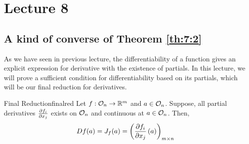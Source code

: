 \documentclass[../Analysis-3.tex]{subfiles}
\begin{document}
\chapter*{Lecture 8} %
\setcounter{chapter}{8} %
\setcounter{section}{0}

\section{A kind of converse of Theorem \ref{th:7:2}}

As we have seen in previous lecture, the differentiability of a function gives an explicit expression for derivative with the existence of partials. In this lecture, we will prove a sufficient condition for differentiability based on its partials, which will be our final reduction for derivatives.

\begin{Thm}{Final Reduction}{finalred}
  Let $ f :\mathcal{O}_{n} \to \mathbb{R}^m $ and $ a \in \mathcal{O}_{n} $. Suppose, all partial derivatives $ \pdv{f_i}{x_j} $ exists on $ \mathcal{O}_{n} $ and continuous at $ a \in \mathcal{O}_{n} $. Then,
  \begin{align*}
    Df(a) = J_{f}(a) = \left( \pdv{f_i}{x_j}\left( a \right) \right)_{m \times n}
  \end{align*}
\end{Thm}
\end{document}
